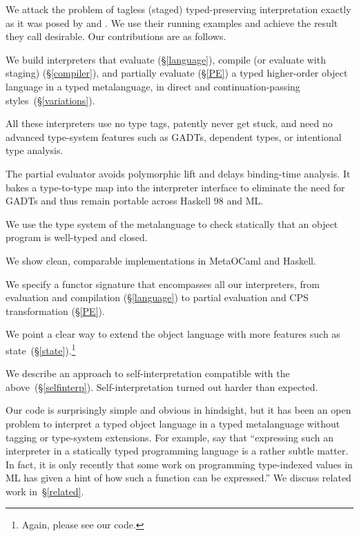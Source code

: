 We attack the problem of tagless (staged) typed-preserving
interpretation exactly as it was posed
by \citet{WalidICFP02} and \citet{xi-guarded}.
We use their running examples and achieve the
result they call desirable.  Our contributions are as follows.

\begin{enumerate*}
\item We build interpreters that evaluate (\S\ref{language}),
    compile (or evaluate with staging) (\S\ref{compiler}), and partially evaluate (\S\ref{PE}) a typed higher-order object language
   in a typed metalanguage, in direct and continuation\hyp passing
   styles\ifshort\else\ (\S\ref{variations})\fi.
\item All these interpreters use no type tags, patently never get stuck,
    and need no advanced type-system features such as GADTs, dependent types,
    or intentional type analysis.
\item The partial evaluator avoids polymorphic lift and delays binding-time
    analysis.  It bakes a type-to-type map into the interpreter
    interface to eliminate the need for GADTs and thus remain portable
    across Haskell 98 and ML.
\item We use the type system of the metalanguage
    to check statically that an object program is well-typed and closed.
\item We show clean, comparable implementations in MetaOCaml and Haskell.
\item We specify a functor signature that encompasses all our
  interpreters, from evaluation and compilation (\S\ref{language}) 
   to partial evaluation \ifshort\else and CPS transformation \fi(\S\ref{PE}).
\item We point a clear way to extend the object language with more features
    such as state\ifshort\else~(\S\ref{state})\fi.\ifshort\footnote{Again, please see our code.}\fi
\item We describe an approach to self\hyp interpretation compatible with the
  above\ifshort\else~(\S\ref{selfinterp})\fi.  Self\hyp interpretation turned out
  harder than expected.\ifshort\footnotemark[\value{footnote}]\fi
\end{enumerate*}
Our code is surprisingly simple and obvious in hindsight, but
it has been an open problem to
interpret a typed object language in a typed metalanguage without
tagging or type\hyp system extensions.  For example, \citet{taha-tag}
say that ``expressing such an interpreter in a statically typed
programming language is a rather subtle matter. In fact, it is only
recently that some work on programming type-indexed values in ML
\cite{yang-encoding} has given a hint of how such a function can be
expressed.''  We discuss related work in~\S\ref{related}.

